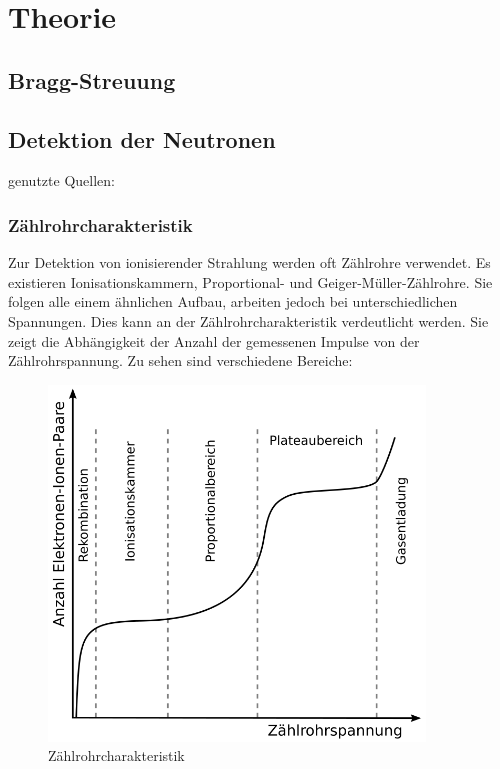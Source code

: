 \section{Theorie}

\subsection{Bragg-Streuung}

\subsection{Detektion der Neutronen}

genutzte Quellen: \cite{PRuD, He3_vacutec, Knoll_2010, Herforth_Koch_1986}


\subsubsection{Zählrohrcharakteristik}

Zur Detektion von ionisierender Strahlung werden oft Zählrohre verwendet. Es existieren Ionisationskammern,  Proportional-  und Geiger-Müller-Zählrohre. Sie folgen alle einem ähnlichen Aufbau, arbeiten jedoch bei unterschiedlichen Spannungen.  Dies kann an der Zählrohrcharakteristik verdeutlicht werden. Sie zeigt die Abhängigkeit der Anzahl der gemessenen Impulse von der  Zählrohrspannung. Zu sehen sind verschiedene Bereiche:


\begin{figure} [!htb]
	\includegraphics [width=10cm] {pics/Kennlinie_Zaehlrohr.png}
	\centering
	\caption {Zählrohrcharakteristik\protect\footnotemark }
\end{figure}

